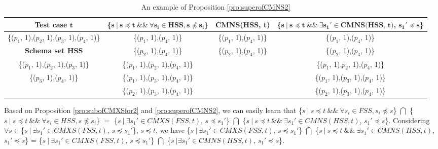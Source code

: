 {\begin{table}[ht]
  \centering
  \setlength{\tabcolsep}{1pt}
  \caption{An example of Proposition \ref{pro:superofCMNS2}}
  {\footnotesize
    \begin{tabular}{|c|c|c|c|}
    \hline
  \textbf{  Test case $\textbf{t}$} & \textbf{ \{$\textbf{s}\ |\ \textbf{s} \preceq \textbf{t}\ \&\&\ \forall \textbf{s}_{\textbf{i}} \in \textbf{HSS}, \textbf{s} \npreceq \textbf{s}_{\textbf{i}} $\} }& \textbf{  CMNS(HSS, t)} & \textbf{\{$ \textbf{s}\ |\ \textbf{s} \preceq \textbf{t} \ \&\& \ \exists \textbf{s}_{\textbf{1}}' \in \textbf{CMNS(HSS, t)}$, $\textbf{s}_{\textbf{1}}' \preceq \textbf{s}$\}}\\\hline
    \{($p_{1}$, 1),($p_{2}$, 1),($p_{3}$, 1),($p_{4}$, 1)\}  & \{($p_{1}$, 1),($p_{4}$, 1)\} & \{($p_{1}$, 1),($p_{4}$, 1)\} & \{($p_{1}$, 1),($p_{4}$, 1)\}\\ \cline{1-1}
      \textbf{Schema set HSS}  & \{($p_{2}$, 1),($p_{4}$, 1)\} & \{($p_{2}$, 1),($p_{4}$, 1)\} & \{($p_{2}$, 1),($p_{4}$, 1)\} \\\cline{1-1}
     \{($p_{1}$, 1),($p_{2}$, 1),($p_{3}$, 1)\}         &\{($p_{1}$, 1),($p_{2}$, 1),($p_{4}$, 1)\}  &  &  \{($p_{1}$, 1),$p_{2}$, 1),($p_{4}$, 1)\}   \\
     \{($p_{3}$, 1),($p_{4}$, 1)\}         &\{($p_{1}$, 1),($p_{3}$, 1),($p_{4}$, 1)\}    &  &  \{($p_{1}$, 1),($p_{3}$, 1),($p_{4}$, 1)\}  \\
                         &\{($p_{2}$, 1),($p_{3}$, 1),($p_{4}$, 1)\}   &  & \{($p_{2}$, 1),($p_{3}$, 1),($p_{4}$, 1)\}   \\ \hline
    \end{tabular}}%
  \label{examleOfCMNSPro2}%
\end{table}%


Based on Proposition \ref{pro:subofCMXSfor2} and \ref{pro:superofCMNS2}, we can easily learn that \{$s\ |\ s \preceq t\ \&\&\ \forall s_{i} \in FSS, s_{i} \npreceq s $\} $\bigcap$ \{$s\ |\ s \preceq t\ \&\&\ \forall s_{i} \in HSS, s \npreceq s_{i} $\}  $=$  \{$ s\ |\ \exists s_{1}' \in CMXS(FSS, t)$, $s \preceq s_{1}'$\} $\bigcap$  \{$ s\ |\ s \preceq t \ \&\& \ \exists s_{1}' \in CMNS(HSS, t)$, $s_{1}' \preceq s$\}.  Considering $\forall s \in $\{$ s\ |\ \exists s_{1}' \in CMXS(FSS, t)$, $s \preceq s_{1}'$\}, $s \preceq t$, we have  \{$ s\ |\ \exists s_{1}' \in CMXS(FSS, t)$, $s \preceq s_{1}'$\} $\bigcap$  \{$ s\ |\ s \preceq t \ \&\& \ \exists s_{1}' \in CMNS(HSS, t)$, $s_{1}' \preceq s$\} =  \{$ s\ |\ \exists s_{1}' \in CMXS(FSS, t)$, $s \preceq s_{1}'$\} $\bigcap$  \{$ s\ | \exists s_{1}' \in CMNS(HSS, t)$, $s_{1}' \preceq s$\}.

}

